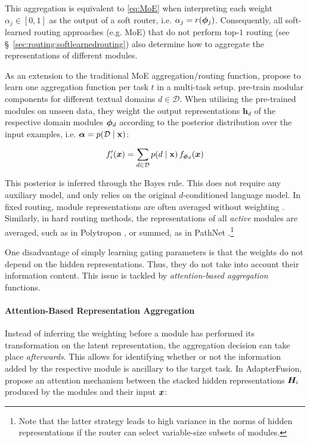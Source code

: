 \documentclass[10pt]{article} %
\begin{document}
This aggregation is equivalent to \cref{eq:MoE} when interpreting each weight $\alpha_j \in [0, 1]$ as the output of a soft router, i.e. $\alpha_j = r({\bm{\phi}}_j)$. Consequently, all soft-learned routing approaches (e.g. MoE) that do not perform top-$1$ routing (see \S~\ref{sec:routing:softlearnedrouting}) also determine how to aggregate the representations of different modules. 

As an extension to the traditional MoE aggregation/routing function, \citet{Ma2018Modeling} propose to learn one aggregation function per task $t$ in a multi-task setup. \citet{Gururangan2022Demix} pre-train modular components for different textual domains $d \in \mathcal{D}$. When utilising the pre-trained modules on unseen data, they weight the output representations $\mathbf{h}_d$ of the respective domain modules ${\bm{\phi}}_d$ according to the posterior distribution over the input examples, i.e. ${\bm{\alpha}} = p(\mathcal{D} \mid \mathbf{x})$:

\begin{equation}
    f_{i}^\prime({\bm{x}})  = \sum_{d \in \mathcal{D}} p(d \mid \mathbf{x}) \, f_{{\bm{\phi}}_d}({\bm{x}}) 
\end{equation}

This posterior is inferred through the Bayes rule. This does not require any auxiliary model, and only relies on the original $d$-conditioned language model. In fixed routing, module representations are often averaged without weighting \citep{Zhang2022SkillNet, Chronopoulou2022EfficientHierarchical}. Similarly, in hard routing methods, the representations of all \textit{active} modules are averaged, such as in Polytropon \citep{ponti2022combining}, or summed, as in PathNet \citep{fernando2017pathnet}.\footnote{Note that the latter strategy leads to high variance in the norms of hidden representations if the router can select variable-size subsets of modules.} 

One disadvantage of simply learning gating parameters is that the weights do not depend on the hidden representations. Thus, they do not take into account their information content. This issue is tackled by \textit{attention-based aggregation} functions.
 

\paragraph*{Attention-Based Representation Aggregation}

Instead of inferring the weighting before a module has performed its transformation on the latent representation, the aggregation decision can take place \textit{afterwards}. This allows for identifying whether or not the information added by the respective module is ancillary to the target task. 
In AdapterFusion, \citet{pfeiffer2020adapterfusion} propose an attention mechanism \citep{Bahdanau2015NMT} between the stacked hidden representations ${\bm{H}}_i$ produced by the modules and their input ${\bm{x}}$:
\end{document}
